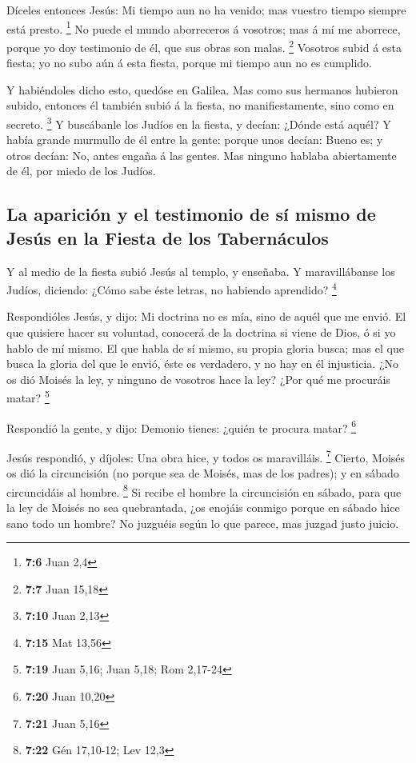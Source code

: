  Díceles entonces Jesús: Mi tiempo aun no ha venido; mas
vuestro tiempo siempre está presto. \footnote{\textbf{7:6} Juan 2,4}
 No puede el mundo aborreceros á vosotros; mas á mí me
aborrece, porque yo doy testimonio de él, que sus obras son malas.
\footnote{\textbf{7:7} Juan 15,18}  Vosotros subid á esta
fiesta; yo no subo aún á esta fiesta, porque mi tiempo aun no es
cumplido.

 Y habiéndoles dicho esto, quedóse en Galilea. 
Mas como sus hermanos hubieron subido, entonces él también subió á la
fiesta, no manifiestamente, sino como en secreto. \footnote{\textbf{7:10}
  Juan 2,13}  Y buscábanle los Judíos en la fiesta, y
decían: ¿Dónde está aquél?  Y había grande murmullo de él
entre la gente: porque unos decían: Bueno es; y otros decían: No, antes
engaña á las gentes.  Mas ninguno hablaba abiertamente de
él, por miedo de los Judíos.

\hypertarget{la-apariciuxf3n-y-el-testimonio-de-suxed-mismo-de-jesuxfas-en-la-fiesta-de-los-tabernuxe1culos}{%
\subsection{La aparición y el testimonio de sí mismo de Jesús en la
Fiesta de los
Tabernáculos}\label{la-apariciuxf3n-y-el-testimonio-de-suxed-mismo-de-jesuxfas-en-la-fiesta-de-los-tabernuxe1culos}}

 Y al medio de la fiesta subió Jesús al templo, y enseñaba.
 Y maravillábanse los Judíos, diciendo: ¿Cómo sabe éste
letras, no habiendo aprendido? \footnote{\textbf{7:15} Mat 13,56}

 Respondióles Jesús, y dijo: Mi doctrina no es mía, sino de
aquél que me envió.  El que quisiere hacer su voluntad,
conocerá de la doctrina si viene de Dios, ó si yo hablo de mí mismo.
 El que habla de sí mismo, su propia gloria busca; mas el
que busca la gloria del que le envió, éste es verdadero, y no hay en él
injusticia.  ¿No os dió Moisés la ley, y ninguno de
vosotros hace la ley? ¿Por qué me procuráis matar? \footnote{\textbf{7:19}
  Juan 5,16; Juan 5,18; Rom 2,17-24}

 Respondió la gente, y dijo: Demonio tienes: ¿quién te
procura matar? \footnote{\textbf{7:20} Juan 10,20}

 Jesús respondió, y díjoles: Una obra hice, y todos os
maravilláis. \footnote{\textbf{7:21} Juan 5,16}  Cierto,
Moisés os dió la circuncisión (no porque sea de Moisés, mas de los
padres); y en sábado circuncidáis al hombre. \footnote{\textbf{7:22} Gén
  17,10-12; Lev 12,3}  Si recibe el hombre la circuncisión
en sábado, para que la ley de Moisés no sea quebrantada, ¿os enojáis
conmigo porque en sábado hice sano todo un hombre?  No
juzguéis según lo que parece, mas juzgad justo juicio.

